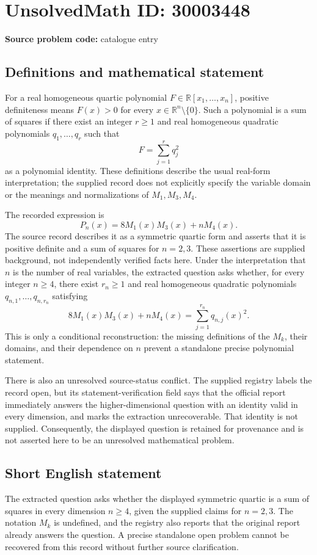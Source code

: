 \documentclass[11pt]{article}
\newcommand{\R}{\mathbb{R}}
\begin{document}
\section*{UnsolvedMath ID: 30003448}
\textbf{Source problem code:} catalogue entry
\subsection{Definitions and mathematical statement}
For a real homogeneous quartic polynomial \(F\in\R[x_1,\ldots,x_n]\), positive definiteness means \(F(x)>0\) for every \(x\in\R^n\setminus\{0\}\). Such a polynomial is a sum of squares if there exist an integer \(r\geq1\) and real homogeneous quadratic polynomials \(q_1,\ldots,q_r\) such that
\[
F=\sum_{j=1}^{r}q_j^2
\]
as a polynomial identity. These definitions describe the usual real-form interpretation; the supplied record does not explicitly specify the variable domain or the meanings and normalizations of \(M_1,M_3,M_4\).

The recorded expression is
\[
P_n(x)=8M_1(x)M_3(x)+nM_4(x).
\]
The source record describes it as a symmetric quartic form and asserts that it is positive definite and a sum of squares for \(n=2,3\). These assertions are supplied background, not independently verified facts here. Under the interpretation that \(n\) is the number of real variables, the extracted question asks whether, for every integer \(n\geq4\), there exist \(r_n\geq1\) and real homogeneous quadratic polynomials \(q_{n,1},\ldots,q_{n,r_n}\) satisfying
\[
8M_1(x)M_3(x)+nM_4(x)
=\sum_{j=1}^{r_n}q_{n,j}(x)^2.
\]
This is only a conditional reconstruction: the missing definitions of the \(M_k\), their domains, and their dependence on \(n\) prevent a standalone precise polynomial statement.

There is also an unresolved source-status conflict. The supplied registry labels the record open, but its statement-verification field says that the official report immediately answers the higher-dimensional question with an identity valid in every dimension, and marks the extraction unrecoverable. That identity is not supplied. Consequently, the displayed question is retained for provenance and is not asserted here to be an unresolved mathematical problem.
\subsection{Short English statement}
The extracted question asks whether the displayed symmetric quartic is a sum of squares in every dimension \(n\geq4\), given the supplied claims for \(n=2,3\). The notation \(M_k\) is undefined, and the registry also reports that the original report already answers the question. A precise standalone open problem cannot be recovered from this record without further source clarification.
\end{document}
